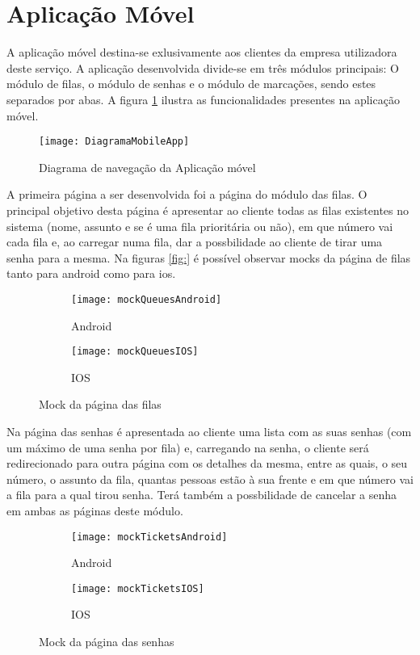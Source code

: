 \usepackage{graphicx}
\graphicspath{ {./images/} }

\section{Aplicação Móvel}
A aplicação móvel destina-se exlusivamente aos clientes da empresa utilizadora deste serviço. 
A aplicação desenvolvida divide-se em três módulos principais: O módulo de filas, o módulo de senhas
e o módulo de marcações, sendo estes separados por abas. A figura \ref{fig:diam} ilustra as funcionalidades presentes na aplicação móvel.
\begin{figure}[h]
    \centering
    \texttt{[image: DiagramaMobileApp]}
    \caption{Diagrama de navegação da Aplicação móvel}
    \label{fig:diam}
\end{figure}

A primeira página a ser desenvolvida foi a página do módulo das filas. O principal objetivo desta página é apresentar ao cliente
todas as filas existentes no sistema (nome, assunto e se é uma fila prioritária ou não), em que número vai cada fila e,
ao carregar numa fila, dar a possbilidade ao cliente de tirar uma senha para a mesma. Na figuras \ref{fig:} é possível observar mocks
da página de filas tanto para android como para ios.

\begin{figure}
\centering
\begin{subfigure}{.5\textwidth}
  \centering
  \texttt{[image: mockQueuesAndroid]}
  \caption{Android}
  \label{fig:queuesAndroid}
\end{subfigure}%
\begin{subfigure}{.5\textwidth}
  \centering
  \texttt{[image: mockQueuesIOS]}
  \caption{IOS}
  \label{fig:queuesIos}
\end{subfigure}
\caption{Mock da página das filas}
\label{fig:mockQueues}
\end{figure}
Na página das senhas é apresentada ao cliente uma lista com as suas senhas (com um máximo de uma senha por fila) e, carregando na senha,
o cliente será redirecionado para outra página com os detalhes da mesma, entre as quais, o seu número, o assunto da fila, quantas pessoas
estão à sua frente e em que número vai a fila para a qual tirou senha. Terá também a possbilidade de cancelar a senha em ambas as páginas
deste módulo.

\begin{figure}
\centering
\begin{subfigure}{.5\textwidth}
  \centering
  \texttt{[image: mockTicketsAndroid]}
  \caption{Android}
  \label{fig:ticketsAndroid}
\end{subfigure}%
\begin{subfigure}{.5\textwidth}
  \centering
  \texttt{[image: mockTicketsIOS]}
  \caption{IOS}
  \label{fig:ticketsIos}
\end{subfigure}
\caption{Mock da página das senhas}
\label{fig:mockTickets}
\end{figure}

